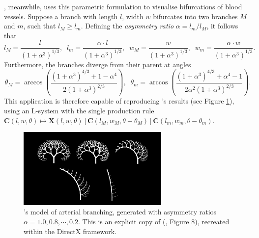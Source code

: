 \documentclass[a4paper, 11pt]{article}
\begin{document}
\begin{flushleft}
\vspace{5pt}\noindent
\citet{zamirArterialBranchingLSystems}, meanwhile, uses this parametric formulation to visualise bifurcations of blood vessels. Suppose a branch with length $l$, width $w$ bifurcates into two branches $M$ and $m$, such that $l_M \geq l_m$. Defining the \textit{asymmetry ratio} $\alpha = l_m/l_M$, it follows that
$$l_M = \frac{l}{\left(1+\alpha^3\right)^{1/3}}, \;\; l_m = \frac{\alpha\cdot l}{\left(1+\alpha^3\right)^{1/3}}, \;\; w_M = \frac{w}{\left(1+\alpha^3\right)^{1/3}}, \;\; w_m = \frac{\alpha\cdot w}{\left(1+\alpha^3\right)^{1/3}}.$$
Furthermore, the branches diverge from their parent at angles
$$\theta_M = \arccos\left(\frac{\left(1+\alpha^3\right)^{4/3}+1-\alpha^4}{2\left(1+\alpha^3\right)^{2/3}}\right), \;\; \theta_m = \arccos\left(\frac{\left(1+\alpha^3\right)^{4/3}+\alpha^4-1}{2\alpha^2\left(1+\alpha^3\right)^{2/3}}\right).$$
This application is therefore capable of reproducing \citeauthor{zamirArterialBranchingLSystems}'s results (see Figure \ref{Zamir's Model}), using an L-system with the single production rule $\mathbf{C}(l,w,\theta) \mapsto \mathbf{X}(l,w,\theta)[\mathbf{C}(l_M,w_M,\theta+\theta_M)]\mathbf{C}(l_m,w_m,\theta-\theta_m)$.

\vspace{5pt}\noindent
\begin{figure}[h]
\centering
\includegraphics[width=0.66\textwidth]{Zamir's Model}
\caption{\citeauthor{zamirArterialBranchingLSystems}'s model of arterial branching, generated with asymmetry ratios $\alpha = 1.0, 0.8, \cdots, 0.2$. This is an explicit copy of \citeauthor{zamirArterialBranchingLSystems} (\citeyear{zamirArterialBranchingLSystems}, Figure 8), recreated within the DirectX framework.}
\label{Zamir's Model}
\end{figure}



\end{flushleft}
\end{document}

